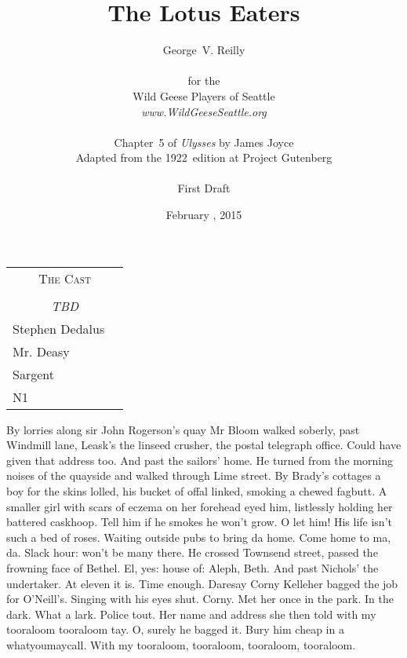 



\title{\Huge The Lotus Eaters}
\author{George~V. Reilly\\
\\
{\small for the}\\
Wild Geese Players of Seattle\\
{\emph{www.WildGeeseSeattle.org}}\\
\\
{\small Chapter~5 of \emph{Ulysses} by James Joyce}\\
{\small Adapted from the 1922~edition at Project Gutenberg}
\\
\\
{\small First Draft}}
\date{February , 2015}
\raggedbottom



\maketitle
\thispagestyle{empty}
\pagebreak

\begin{tabular}{lp{10cm}}
    \multicolumn{2}{c}{\Large \textsc{The Cast}} \\
\\
    \multicolumn{2}{c}{\large \textit{TBD}} \\
Stephen Dedalus \\
Mr. Deasy \\
Sargent \\
N1 \\
\end{tabular}

\thispagestyle{empty}
\newpage


\setcounter{page}{1}
By lorries along sir John Rogerson's quay Mr Bloom walked soberly, past
Windmill lane, Leask's the linseed crusher, the postal telegraph office.
Could have given that address too. And past the sailors' home. He turned
from the morning noises of the quayside and walked through Lime street.
By Brady's cottages a boy for the skins lolled, his bucket of offal
linked, smoking a chewed fagbutt. A smaller girl with scars of eczema on
her forehead eyed him, listlessly holding her battered caskhoop. Tell him
if he smokes he won't grow. O let him! His life isn't such a bed of
roses. Waiting outside pubs to bring da home. Come home to ma, da. Slack
hour: won't be many there. He crossed Townsend street, passed the
frowning face of Bethel. El, yes: house of: Aleph, Beth. And past
Nichols' the undertaker. At eleven it is. Time enough. Daresay Corny
Kelleher bagged the job for O'Neill's. Singing with his eyes shut. Corny.
Met her once in the park. In the dark. What a lark. Police tout. Her name
and address she then told with my tooraloom tooraloom tay. O, surely he
bagged it. Bury him cheap in a whatyoumaycall. With my tooraloom,
tooraloom, tooraloom, tooraloom.

